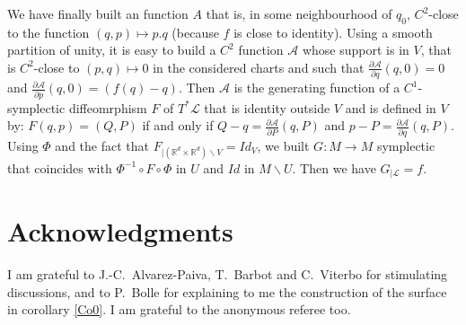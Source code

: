 \documentclass{dcds}
\theoremstyle{definition}
\begin{document}
 We have finally built an function $A$ that is, in some neighbourhood of $q_0$, $C^2$-close to the function $(q,p)\mapsto p.q$ (because $f$ is close to identity). Using a smooth partition  of unity, it is easy to build a $C^2$ function ${\mathcal {A}}$ whose support is in $V$, that is $C^2$-close to $(p, q)\mapsto 0$ in the considered charts and such that
 $\frac{\partial {\mathcal {A}}}{\partial q}(q, 0)=0$ and $\frac{\partial {\mathcal {A}}}{\partial p}(q, 0)=(f(q)-q)$. Then ${\mathcal {A}}$ is the generating function of a $C^1$-symplectic diffeomrphism $F$ of $T^*{\mathcal {L}}$ that is identity outside $V$ and is defined in $V$ by: $F(q,p)=(Q,P)$ if and only if $Q-q=\frac{\partial{\mathcal {A}}}{\partial P}(q, P)$ and $p-P=\frac{\partial {\mathcal {A}}}{\partial q}(q,P)$. Using $\Phi$ and the fact that $F_{|({\mathbb {R}}^d\times {\mathbb {R}}^d)\backslash V}=Id_V$, we built $G: M\rightarrow M$ symplectic that coincides with $\Phi^{-1}\circ F\circ \Phi$ in $U$ and $Id$ in $M\backslash U$. Then we have $G_{|{\mathcal {L}}}=f$.

\section*{Acknowledgments}   I am  grateful  to J.-C.~Alvarez-Paiva, T.~Barbot and C.~Vite\-rbo for stimulating discussions, and to P.~Bolle for explaining to me the construction of the surface  in corollary \ref{Co0}. I am grateful to the anonymous referee too.
\end{document}
